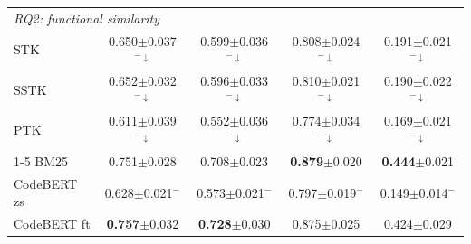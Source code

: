 \begin{table}[t]
\begin{tabular}{lcccc}
\midrule
\multicolumn{5}{l}{\emph{RQ2: functional similarity}} \\
\quad STK & 0.650$\pm$0.037$^{-\downarrow}$ & 0.599$\pm$0.036$^{-\downarrow}$ & 0.808$\pm$0.024$^{-\downarrow}$ & 0.191$\pm$0.021$^{-\downarrow}$ \\
\quad SSTK & 0.652$\pm$0.032$^{-\downarrow}$ & 0.596$\pm$0.033$^{-\downarrow}$ & 0.810$\pm$0.021$^{-\downarrow}$ & 0.190$\pm$0.022$^{-\downarrow}$ \\
\quad PTK & 0.611$\pm$0.039$^{-\downarrow}$ & 0.552$\pm$0.036$^{-\downarrow}$ & 0.774$\pm$0.034$^{-\downarrow}$ & 0.169$\pm$0.021$^{-\downarrow}$ \\
\cmidrule(lr){1-5}
\quad BM25 & 0.751$\pm$0.028 & 0.708$\pm$0.023 & \textbf{0.879}$\pm$0.020 & \textbf{0.444}$\pm$0.021 \\
\quad CodeBERT zs & 0.628$\pm$0.021$^{-}$ & 0.573$\pm$0.021$^{-}$ & 0.797$\pm$0.019$^{-}$ & 0.149$\pm$0.014$^{-}$ \\
\quad CodeBERT ft & \textbf{0.757}$\pm$0.032 & \textbf{0.728}$\pm$0.030 & 0.875$\pm$0.025 & 0.424$\pm$0.029 \\
\bottomrule
\end{tabular}
\end{table}
